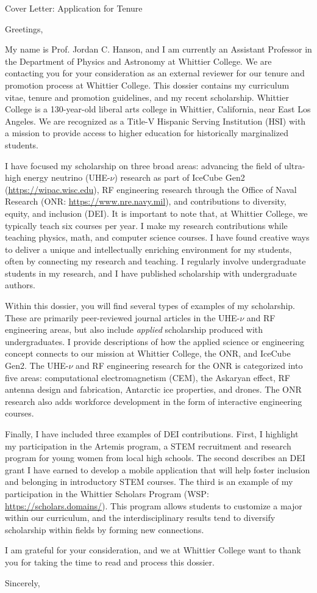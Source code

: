 \documentclass[11pt, a4paper]{letter}
\begin{document}
\begin{letter}{
	Cover Letter: Application for Tenure
}

\opening{Greetings,}

My name is Prof. Jordan C. Hanson, and I am currently an Assistant Professor in the Department of Physics and Astronomy at Whittier College.  We are contacting you for your consideration as an external reviewer for our tenure and promotion process at Whittier College.  This dossier contains my curriculum vitae, tenure and promotion guidelines, and my recent scholarship.  Whittier College is a 130-year-old liberal arts college in Whittier, California, near East Los Angeles.  We are recognized as a Title-V Hispanic Serving Institution (HSI) with a mission to provide access to higher education for historically marginalized students.

I have focused my scholarship on three broad areas: advancing the field of ultra-high energy neutrino (UHE-$\nu$) research as part of IceCube Gen2 (\url{https://wipac.wisc.edu}), RF engineering research through the Office of Naval Research (ONR: \url{https://www.nre.navy.mil}), and contributions to diversity, equity, and inclusion (DEI).  It is important to note that, at Whittier College, we typically teach six courses per year. I make my research contributions while teaching physics, math, and computer science courses.  I have found creative ways to deliver a unique and intellectually enriching environment for my students, often by connecting my research and teaching. I regularly involve undergraduate students in my research, and I have published scholarship with undergraduate authors.

Within this dossier, you will find several types of examples of my scholarship.  These are primarily peer-reviewed journal articles in the UHE-$\nu$ and RF engineering areas, but also include \textit{applied} scholarship produced with undergraduates.  I provide descriptions of how the applied science or engineering concept connects to our mission at Whittier College, the ONR, and IceCube Gen2.  The UHE-$\nu$ and RF engineering research for the ONR is categorized into five areas: computational electromagnetism (CEM), the Askaryan effect, RF antenna design and fabrication, Antarctic ice properties, and drones.  The ONR research also adds workforce development in the form of interactive engineering courses.

Finally, I have included three examples of DEI contributions.  First, I highlight my participation in the Artemis program, a STEM recruitment and research program for young women from local high schools.  The second describes an DEI grant I have earned to develop a mobile application that will help foster inclusion and belonging in introductory STEM courses.  The third is an example of my participation in the Whittier Scholars Program (WSP: \url{https://scholars.domains/}).  This program allows students to customize a major within our curriculum, and the interdisciplinary results tend to diversify scholarship within fields by forming new connections.

I am grateful for your consideration, and we at Whittier College want to thank you for taking the time to read and process this dossier.

\closing{Sincerely,}
\end{letter}
\end{document}
